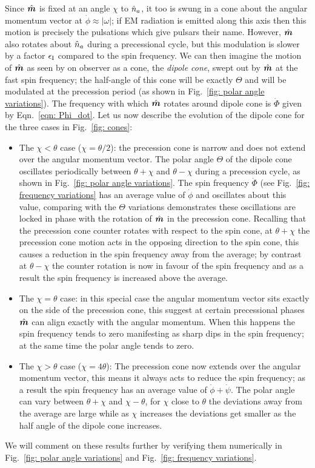 \documentclass[../full_thesis/full_thesis.tex]{subfiles}
\begin{document}
Since $\hat{\boldsymbol{m}}$ is fixed at an angle $\chi$ to $\hat{n}_a$, it too is swung in a cone
about the angular momentum vector at $\dot{\phi}\approx |\omega|$; if EM
radiation is emitted along this axis then this motion is precisely the
pulsations which give pulsars their name.  However, $\hat{\boldsymbol{m}}$ also rotates about
$\hat{n}_a$ during a precessional cycle, but this modulation is slower by a factor
$\epsilon_{\mathrm{I}}$ compared to the spin frequency. We can then imagine the motion of $\hat{\boldsymbol{m}}$
as seen by on observer as a cone, the \emph{dipole cone}, swept out by $\hat{\boldsymbol{m}}$ at
the fast spin frequency; the half-angle of this cone will be exactly $\Theta$
and will be modulated at the precession period (as shown in Fig.~\ref{fig:
polar angle variations}).  The frequency with which $\hat{\boldsymbol{m}}$ rotates around dipole
cone is $\dot{\Phi}$ given by Eqn.~\eqref{eqn: Phi_dot}. Let us now describe
the evolution of the dipole cone for the three cases in Fig.~\ref{fig: cones}:
\begin{itemize}
\item The $\chi < \theta$ case ($\chi = \theta/2$): the precession cone is
narrow and does not extend over the angular momentum vector. The polar angle
$\Theta$ of the dipole cone oscillates periodically between $\theta+\chi$ and
$\theta-\chi$ during a precession cycle, as shown in Fig.~\ref{fig: polar angle
variations}.  The spin frequency $\dot{\Phi}$ (see Fig.~\ref{fig: frequency
variations} has an average value of $\dot{\phi}$ and oscillates about this
value, comparing with the $\Theta$ variations demonstrates these oscillations
are locked in phase with the rotation of $\hat{\boldsymbol{m}}$ in the precession cone. Recalling
that the precession cone counter rotates with respect to the spin cone, at
$\theta+\chi$ the precession cone motion acts in the opposing direction to the
spin cone, this causes a reduction in the spin frequency away from the average;
by contrast at $\theta-\chi$ the counter rotation is now in favour of the spin
frequency and as a result the spin frequency is increased above the average.

\item The $\chi = \theta$ case: in this special case the angular momentum vector sits exactly
on the side of the precession cone, this suggest at certain precessional phases $\hat{\boldsymbol{m}}$ can align exactly with
the angular momentum. When this happens the spin frequency tends to zero manifesting as sharp dips in the
spin frequency; at the same time the polar angle tends to zero.

\item The $\chi > \theta$ case ($\chi = 4\theta$): The precession cone now extends over the
angular momentum vector, this means it always acts to reduce the spin
frequency; as a result the spin frequency has an average value of
$\dot{\phi} + \dot{\psi}$. The polar angle can vary between $\theta+\chi$ and
$\chi-\theta$, for $\chi$ close to $\theta$ the deviations away from the
average are large while as $\chi$ increases the deviations get smaller as
the half angle of the dipole cone increases.
\end{itemize}
We will comment on these results further by verifying them numerically in
Fig.~\ref{fig: polar angle variations} and Fig.~\ref{fig: frequency variations}.
\end{document}
